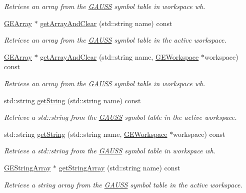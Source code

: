 \begin{DoxyCompactItemize}
\begin{DoxyCompactList}\small\item\em Retrieve an array from the \hyperlink{class_g_a_u_s_s}{G\+A\+U\+SS} symbol table in workspace {\itshape wh}. \end{DoxyCompactList}\item 
\hyperlink{class_g_e_array}{G\+E\+Array} $\ast$ \hyperlink{class_g_a_u_s_s_a0d16f5307a11de5f943106df131a0d3c}{get\+Array\+And\+Clear} (std\+::string name) const
\begin{DoxyCompactList}\small\item\em Retrieve an array from the \hyperlink{class_g_a_u_s_s}{G\+A\+U\+SS} symbol table in the active workspace. \end{DoxyCompactList}\item 
\hyperlink{class_g_e_array}{G\+E\+Array} $\ast$ \hyperlink{class_g_a_u_s_s_a38de5e7c3153f8948ca7d463248e5d80}{get\+Array\+And\+Clear} (std\+::string name, \hyperlink{class_g_e_workspace}{G\+E\+Workspace} $\ast$workspace) const
\begin{DoxyCompactList}\small\item\em Retrieve an array from the \hyperlink{class_g_a_u_s_s}{G\+A\+U\+SS} symbol table in workspace {\itshape wh}. \end{DoxyCompactList}\item 
std\+::string \hyperlink{class_g_a_u_s_s_a3a80b7cf90a447739efe07360e5449f7}{get\+String} (std\+::string name) const
\begin{DoxyCompactList}\small\item\em Retrieve a std\+::string from the \hyperlink{class_g_a_u_s_s}{G\+A\+U\+SS} symbol table in the active workspace. \end{DoxyCompactList}\item 
std\+::string \hyperlink{class_g_a_u_s_s_a7eb018ed1e0c4743db2c5e5d323f7757}{get\+String} (std\+::string name, \hyperlink{class_g_e_workspace}{G\+E\+Workspace} $\ast$workspace) const
\begin{DoxyCompactList}\small\item\em Retrieve a std\+::string from the \hyperlink{class_g_a_u_s_s}{G\+A\+U\+SS} symbol table in workspace {\itshape wh}. \end{DoxyCompactList}\item 
\hyperlink{class_g_e_string_array}{G\+E\+String\+Array} $\ast$ \hyperlink{class_g_a_u_s_s_ad8406a03d1699e341b6fea1d51b97f29}{get\+String\+Array} (std\+::string name) const
\begin{DoxyCompactList}\small\item\em Retrieve a string array from the \hyperlink{class_g_a_u_s_s}{G\+A\+U\+SS} symbol table in the active workspace. \end{DoxyCompactList}\item 

\end{DoxyCompactItemize}
